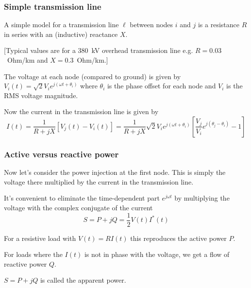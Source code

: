 \documentclass[10pt,dvipsnames]{beamer}
\begin{document}
\begin{frame}
  \frametitle{Simple transmission line}

  A simple model for a transmission line $\ell$ between nodes $i$ and
  $j$ is a resistance $R$ in series with an (inductive) reactance $X$.

  [Typical values are for a 380~kV overhead transmission line e.g. $R = 0.03$~Ohm/km and $X = 0.3$~Ohm/km.]

  The voltage at each node (compared to ground) is given by $V_i(t) = \sqrt{2}
  V_ie^{j(\omega t + \theta_i)}$ where $\theta_i$ is the phase offset
  for each node and $V_i$ is the RMS voltage magnitude.

  Now the current in the transmission line is given by
  \begin{equation*}
    I(t) = \frac{1}{R + jX} \left[ V_j(t) - V_i(t) \right] =  \frac{1}{R + jX}\sqrt{2} V_i e^{j(\omega t + \theta_i)} \left[\frac{V_j}{V_i} e^{j(\theta_j - \theta_i)} - 1\right]
  \end{equation*}



\end{frame}


\begin{frame}
  \frametitle{Active versus reactive power}

  Now let's consider the power injection at the first node. This is
  simply the voltage there multiplied by the current in the
  transmission line.

  It's convenient to eliminate the time-dependent part $e^{j\omega t}$
  by multiplying the voltage with the complex conjugate of the current
  \begin{equation*}
    S = P + jQ = \frac{1}{2} V(t)I^*(t)
  \end{equation*}

  For a resistive load with $V(t) = R I(t)$ this reproduces the
  \alert{active power} $P$.

  For loads where the $I(t)$ is not in phase with the voltage, we get
  a flow of \alert{reactive power} $Q$.

  $S = P + j Q$ is called the \alert{apparent power}.

\end{frame}
\end{document}
